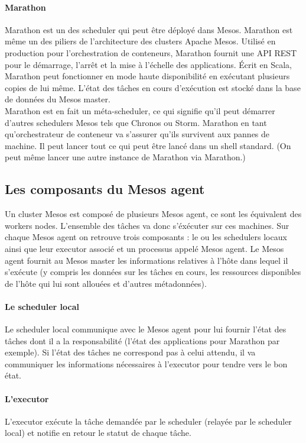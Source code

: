 \documentclass[11pt,fleqn]{book} %
\begin{document}
\paragraph*{Marathon}
Marathon est un des scheduler qui peut être déployé dans Mesos. Marathon est même un des piliers de l'architecture des clusters Apache Mesos. Utilisé en production pour l'orchestration de conteneurs, Marathon fournit une API REST pour le démarrage, l'arrêt et la mise à l'échelle des applications. Écrit en Scala, Marathon peut fonctionner en mode haute disponibilité en exécutant plusieurs copies de lui même. L'état des tâches en cours d'exécution est stocké dans la base de données du Mesos master.\\

Marathon est en fait un méta-scheduler, ce qui signifie qu'il peut démarrer d'autres schedulers Mesos tels que Chronos ou Storm. Marathon en tant qu'orchestrateur de conteneur va s'assurer qu'ils survivent aux pannes de machine. Il peut lancer tout ce qui peut être lancé dans un shell standard. (On peut même lancer une autre instance de Marathon via Marathon.)

\subsection*{Les composants du Mesos agent}
Un cluster Mesos est composé de plusieurs Mesos agent, ce sont les équivalent des workers nodes. L'ensemble des tâches va donc s'éxécuter sur ces machines. Sur chaque Mesos agent on retrouve trois composants : le ou les schedulers locaux ainsi que leur executor associé et un processus appelé Mesos agent. Le Mesos agent fournit au Mesos master les informations relatives à l'hôte dans lequel il s'exécute (y compris les données sur les tâches en cours, les ressources disponibles de l'hôte qui lui sont allouées et d'autres métadonnées).

\paragraph*{Le scheduler local}
Le scheduler local communique avec le Mesos agent pour lui fournir l'état des tâches dont il a la responsabilité (l'état des applications pour Marathon par exemple). Si l'état des tâches ne correspond pas à celui attendu, il va communiquer les informations nécessaires à l'executor pour tendre vers le bon état.

\paragraph*{L'executor}
L'executor exécute la tâche demandée par le scheduler (relayée par le scheduler local) et notifie en retour le statut de chaque tâche.
\end{document}
